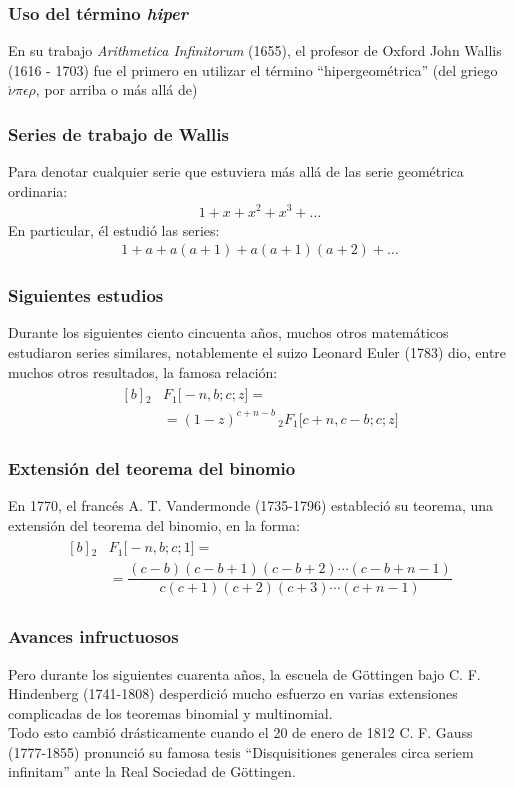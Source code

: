 \documentclass[12pt]{beamer}
\begin{document}
\begin{frame}
\frametitle{Uso del término \emph{hiper}}
En su trabajo \emph{Arithmetica Infinitorum} (1655), el profesor de Oxford John Wallis (1616 - 1703) fue el primero en utilizar el término \enquote{hipergeométrica} (del griego $\acute{\nu} \pi \epsilon \rho$, por arriba o más allá de)
\end{frame}
\begin{frame}
\frametitle{Series de trabajo de Wallis}
Para denotar cualquier serie que estuviera más allá de las serie geométrica ordinaria:
\pause
\begin{align*}
1 + x + x^{2} + x^{3} + \ldots
\end{align*}
\pause
En particular, él estudió las series:
\begin{align*}
1 + a + a( a + 1) + a (a + 1)(a + 2) + \ldots
\end{align*}
\end{frame}
\begin{frame}
\frametitle{Siguientes estudios}
Durante los siguientes ciento cincuenta años, muchos otros
matemáticos estudiaron series similares, notablemente el suizo Leonard Euler (1783) dio, entre muchos otros resultados, la famosa relación:
\pause
\begin{align}
\begin{aligned}[b]
{}_{2} &F_{1} \big[ -n, b; c; z \big] = \\[0.5em]
&= (1 - z)^{c+n-b} \, {}_{2} F_{1} \big[ c + n, c - b; c; z \big]
\end{aligned}
\label{eq:ecuacion_01_01_03} 
\end{align}
\end{frame}
\begin{frame}
\frametitle{Extensión del teorema del binomio}
En 1770, el francés A. T. Vandermonde (1735-1796) estableció su teorema, una extensión del teorema del binomio, en la forma:
\pause
\begin{align}
\begin{aligned}[b]
{}_{2} &F_{1} \big[ -n, b; c; 1 \big] = \\[0.5em]
&= \dfrac{(c {-} b)(c {-} b {+} 1)(c {-} b {+} 2) \cdots (c {-} b {+} n {-} 1)}{c (c {+} 1)(c {+} 2)(c {+} 3) \cdots (c {+} n {-} 1)}
\end{aligned}
\label{eq:ecuacion_01_01_04}
\end{align}
\end{frame}
\begin{frame}
\frametitle{Avances infructuosos}
Pero durante los siguientes cuarenta años, la escuela de Göttingen bajo C. F. Hindenberg (1741-1808) desperdició mucho esfuerzo en varias extensiones complicadas de los teoremas binomial y multinomial.
\\
\bigskip
\pause
Todo esto cambió drásticamente cuando el 20 de enero de 1812 C. F. Gauss (1777-1855) pronunció su famosa tesis \enquote{Disquisitiones generales circa seriem infinitam} ante la Real Sociedad de Göttingen.
\end{frame}
\end{document}
